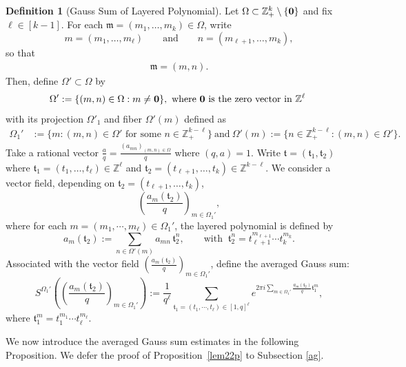 \documentclass[11 pt,letterpaper]{amsart}
\theoremstyle{plain}
\theoremstyle{definition}
\newtheorem{definition}{Definition}\numberwithin{definition}{section}
\theoremstyle{remark} \theoremstyle{exam} \theoremstyle{ob}
\numberwithin{equation}{section}
\begin{document}
 \begin{definition}[Gauss Sum of Layered Polynomial]
 Let $\Omega\subset \mathbb{Z}_+^k \setminus \{{\bf 0}\}$ and fix $ \ell \in  [k-1]$. For each $\mathfrak{m}=(m_1,\ldots,m_k)\in\Omega$, write \[ m=(m_1,\ldots,m_\ell) \qquad\text{and}\qquad n=(m_{\ell+1},\ldots,m_k), \] so that \begin{align}\label{pf1} \mathfrak{m}=(m,n). \end{align}
Then, define $\Omega'\subset\Omega$ by
\begin{align*}
\Omega':=  
	\{ (m,n)\in\Omega: m\ne {\bf 0}\}, \ \text{where ${\bf 0}$ is the zero vector in $\mathbb{Z}^{\ell}$}\  
\end{align*}
with its projection
$\Omega'_{1}$ and fiber $\Omega'(m)$ defined as \begin{align*}
	\Omega_{1}' &:=\{m: (m,n)\in \Omega'\text{ for some } n\in\mathbb{Z}_{+}^{k-\ell}\} \ \text{and}\ \Omega'(m):= \{ n\in\mathbb Z_+^{k-\ell}: (m,n)\in \Omega' \}.
\end{align*}	Take a rational vector 
$
\frac{a}{q}=\frac{(a_{mn})_{(m,n)\in \Omega}}{q} 
$ where  $(q,a)=1$.  Write $\mathfrak{t}=(\mathfrak{t}_1,\mathfrak{t}_2)$ where $\mathfrak{t}_1=(t_{1},\dots,t_{\ell})\in \mathbb{Z}^{\ell}$ and $\mathfrak{t}_2=(t_{\ell+1},\dots,t_k)\in \mathbb{Z}^{k-\ell}$.
We consider a vector field, depending on $\mathfrak{t}_2=(t_{\ell+1},\dots,t_k)$,
\[
\left( \frac{a_{m}(\mathfrak{t}_2)}{q} \right)_{m\in \Omega_{1}'},
\]
where   for each $m=(m_1,\cdots,m_{\ell})\in \Omega_1'$,  the layered polynomial is defined by
\[
a_{m}(\mathfrak{t}_2):=\sum_{n \in \Omega'(m)} a_{mn}\,\mathfrak{t}_2^{n}, 
\qquad \text{with } \ \mathfrak{t}_2^n=t_{\ell+1}^{m_{\ell+1}}\cdots t_k^{m_k}.
\]
 Associated with the vector field  $\left( \frac{a_{m}(\mathfrak{t}_2)}{q} \right)_{m\in \Omega_{1}'}$,    define the averaged Gauss sum: $$S^{\Omega_{1}'}\left(\left( \frac{a_{m}(\mathfrak{t}_2)}{q} \right)_{m\in \Omega_{1}'}\right):= \frac{1}{q^\ell}\sum_{\mathfrak{t}_1= (t_1,\cdots,t_\ell)\in  [1,q]^{\ell}}e^{2\pi i \sum_{m\in\Omega_1' }  \frac{a_{m}(\mathfrak{t}_2)}{q}  \mathfrak{t}_1^{m}},$$  
where  $\mathfrak{t}_1^{m}=t_1^{m_1}\cdots t_\ell^{m_\ell}.$
\end{definition}






 We now introduce the averaged Gauss sum estimates in the following Proposition. We defer the proof of Proposition~\ref{lem22p}  to Subsection \ref{ag}.
 
\end{document}

